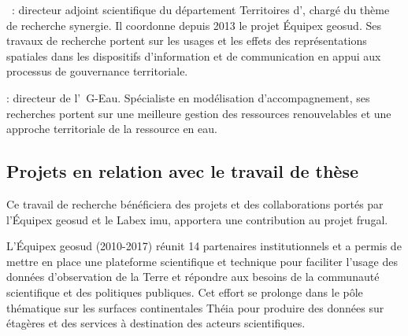  : directeur adjoint scientifique du département Territoires d'{\IRSTEA}, chargé du thème de recherche {\sc synergie}.
Il coordonne depuis 2013 le projet Équipex {\sc geosud}. Ses travaux de recherche portent sur les usages et les effets
des représentations spatiales dans les dispositifs d'information et de communication en appui aux processus de gouvernance territoriale.

 : directeur de l'{\UMR\ G-Eau}.
Spécialiste en modélisation d'accompagnement,
ses recherches portent sur une meilleure gestion des ressources renouvelables
et une approche territoriale de la ressource en eau.


\subsection{Projets en relation avec le travail de thèse}


Ce travail de recherche bénéficiera des projets et des collaborations portés par l'Équipex {\sc geosud} et le Labex {\sc imu},
apportera une contribution au projet {\sc frugal}.

L'Équipex {\sc geosud} (2010-2017) réunit 14 partenaires institutionnels et a permis de mettre en place une plateforme
scientifique et technique pour faciliter l'usage des données d'observation de la Terre et répondre aux besoins
de la communauté scientifique et des politiques publiques.
Cet effort se prolonge dans le pôle thématique sur les surfaces continentales Théia
pour produire des données sur étagères et des services à destination des acteurs scientifiques.

